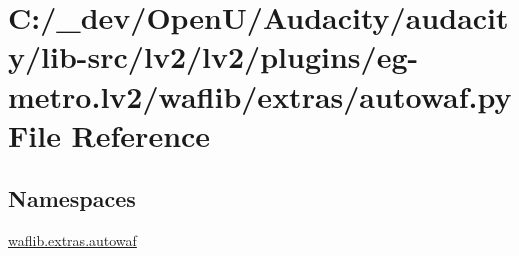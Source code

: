 \hypertarget{lv2_2plugins_2eg-metro_8lv2_2waflib_2extras_2autowaf_8py}{}\section{C\+:/\+\_\+dev/\+Open\+U/\+Audacity/audacity/lib-\/src/lv2/lv2/plugins/eg-\/metro.lv2/waflib/extras/autowaf.py File Reference}
\label{lv2_2plugins_2eg-metro_8lv2_2waflib_2extras_2autowaf_8py}
\subsection*{Namespaces}
\begin{DoxyCompactItemize}
\item 
 \hyperlink{namespacewaflib_1_1extras_1_1autowaf}{waflib.\+extras.\+autowaf}
\end{DoxyCompactItemize}
